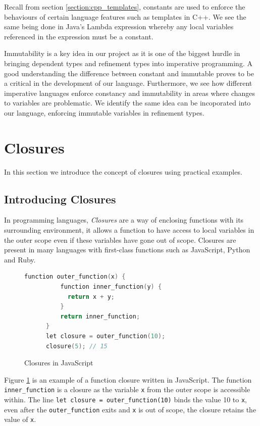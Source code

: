 \documentclass[a4paper,12pt]{report}
\begin{document}
\par
Recall from section \ref{section:cpp_templates}, constants are used to enforce 
the behaviours of certain language features such as templates in C++. 
We see the same being done in Java's Lambda expression whereby any local variables 
referenced in the expression must be a constant. 

\par
Immutability is a key idea in our project as it is one of the biggest hurdle in 
bringing dependent types and refinement types into imperative programming. A 
good understanding the difference between constant and immutable proves to be a 
critical in the development of our language. Furthermore, we see how different 
imperative languages enforce constancy and immutability in areas where changes 
to variables are problematic. We identify the same idea can be incoporated into 
our language, enforcing immutable variables in refinement types. 

\section{Closures} \label{section:closures}
In this section we introduce the concept of closures using practical examples. 

\subsection{Introducing Closures}
In programming languages, \textit{Closures} are a way of enclosing functions 
with its surrounding environment, it allows a function to have access to local 
variables in the outer scope even if these variables have gone out of scope. 
Closures are present in many languages with first-class functions such as 
JavaScript, Python and Ruby. 

\begin{figure}[h]
  \begin{center}
    \begin{lstlisting}[language=C]
      function outer_function(x) {
          function inner_function(y) {
            return x + y;
          }
          return inner_function;
      }
      let closure = outer_function(10);
      closure(5); // 15
    \end{lstlisting}    
  \end{center}
  \caption{Closures in JavaScript}
  \label{code:clousure_js}
\end{figure}

Figure \ref{code:clousure_js} is an example of a function closure written in 
JavaScript. The function \verb|inner_function| is a closure as the variable 
\verb|x| from the outer scope is accessible within. The line 
\verb|let closure = outer_function(10)| binds the value 10 to \verb|x|, even after the 
\verb|outer_function| exits and \verb|x| is out of scope, the closure retains 
the value of \verb|x|.
\end{document}

